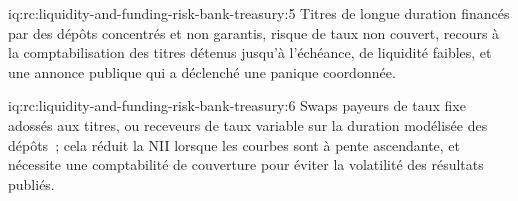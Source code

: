 \begin{solution}{iq:rc:liquidity-and-funding-risk-bank-treasury:5}
Titres de longue duration financés par des dépôts concentrés et non garantis, risque de taux non couvert, recours à la
comptabilisation des titres détenus jusqu'à l'échéance,  de liquidité faibles, et une annonce publique qui a déclenché une
panique coordonnée.
\end{solution}

\begin{solution}{iq:rc:liquidity-and-funding-risk-bank-treasury:6}
Swaps payeurs de taux fixe adossés aux titres, ou receveurs de taux variable sur la duration modélisée des dépôts~; cela
réduit la NII lorsque les courbes sont à pente ascendante, et nécessite une comptabilité de couverture pour éviter la volatilité des
résultats publiés.
\end{solution}
